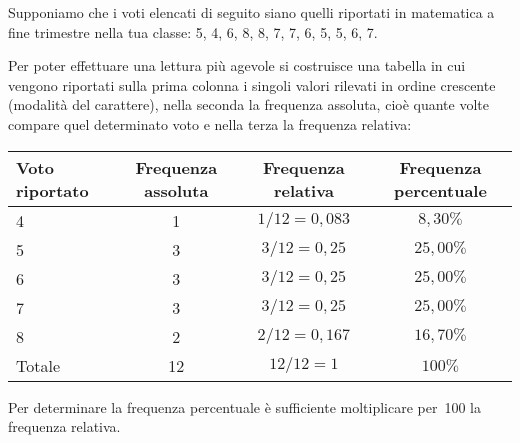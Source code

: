  \begin{esempio}

Supponiamo che i voti elencati di seguito siano quelli riportati in 
matematica a fine trimestre
nella tua classe: 5, 4, 6, 8, 8, 7, 7, 6, 5, 5, 6, 7.

Per poter effettuare una lettura più agevole si costruisce una tabella in 
cui vengono riportati sulla prima colonna i singoli valori rilevati in 
ordine crescente (modalità del carattere),
nella seconda la frequenza assoluta, cioè quante volte compare quel 
determinato voto e nella terza la frequenza relativa:

\begin{center}
\begin{tabular}{lccc}
\toprule
Voto riportato & Frequenza assoluta & Frequenza relativa & Frequenza 
percentuale \\
\midrule
4 & 1 & $1/12=0,083$ & $8,30\%$ \\
5 & 3 & $3/12=0,25$ & $25,00\%$ \\
6 & 3 & $3/12=0,25$ & $25,00\%$ \\
7 & 3 & $3/12=0,25$ & $25,00\%$ \\
8 & 2 & $2/12=0,167$ & $16,70\%$ \\
Totale & 12 & $12/12=1$ & $100\%$ \\
\bottomrule
\end{tabular}
\end{center}

Per determinare la frequenza percentuale è sufficiente moltiplicare per~100 
la frequenza relativa.
 \end{esempio}


